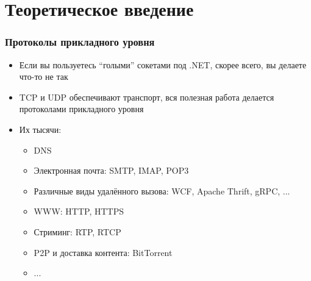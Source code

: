 \documentclass{../../slides-style}
\begin{document}
    \begin{frame}[plain]
        \titlepage
    \end{frame}

    \section{Теоретическое введение}

    \begin{frame}
        \frametitle{Протоколы прикладного уровня}
        \begin{itemize}
            \item Если вы пользуетесь \enquote{голыми} сокетами под .NET, скорее всего, вы делаете что-то не так
            \item TCP и UDP обеспечивают транспорт, вся полезная работа делается протоколами прикладного уровня
            \item Их тысячи:
            \begin{itemize}
                \item DNS
                \item Электронная почта: SMTP, IMAP, POP3
                \item Различные виды удалённого вызова: WCF, Apache Thrift, gRPC, ...
                \item WWW: HTTP, HTTPS
                \item Стриминг: RTP, RTCP
                \item P2P и доставка контента: BitTorrent
                \item ...
            \end{itemize}
        \end{itemize}
    \end{frame}
\end{document}
